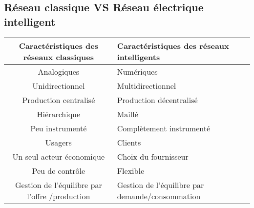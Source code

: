 \subsection{Réseau classique VS Réseau électrique intelligent}
\noindent
\noindent
\begin{tabularx}{\linewidth}{|c|X|l|}
\hline
Caractéristiques des réseaux classiques & Caractéristiques des réseaux intelligents\\
\hline
Analogiques & Numériques\\ 
Unidirectionnel & Multidirectionnel\\ 
Production centralisé & Production décentralisé\\ 
Hiérarchique & Maillé\\ 
Peu instrumenté & Complètement instrumenté\\ 
Usagers & Clients\\ 
Un seul acteur économique & Choix du fournisseur\\ 
Peu de contrôle & Flexible\\ 
Gestion de l'équilibre par l'offre /production & Gestion de l'équilibre par demande/consommation\\ 
\hline
\end{tabularx}